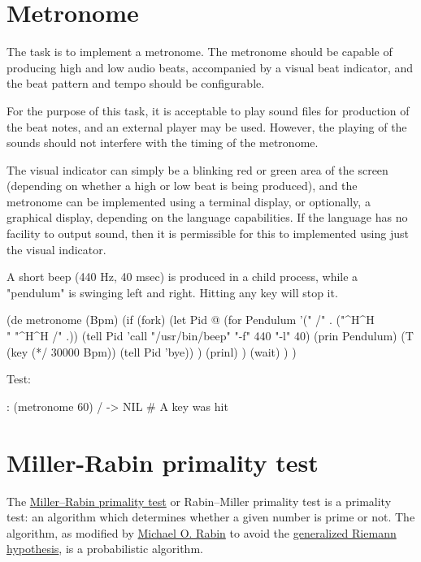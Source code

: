 \pagebreak{}
\section*{Metronome}

The task is to implement a metronome. The metronome should be capable of
producing high and low audio beats, accompanied by a visual beat
indicator, and the beat pattern and tempo should be configurable.

For the purpose of this task, it is acceptable to play sound files for
production of the beat notes, and an external player may be used.
However, the playing of the sounds should not interfere with the timing
of the metronome.

The visual indicator can simply be a blinking red or green area of the
screen (depending on whether a high or low beat is being produced), and
the metronome can be implemented using a terminal display, or
optionally, a graphical display, depending on the language capabilities.
If the language has no facility to output sound, then it is permissible
for this to implemented using just the visual indicator.


\begin{wideverbatim}

A short beep (440 Hz, 40 msec) is produced in a child process, while a
"pendulum" is swinging left and right. Hitting any key will stop it.

(de metronome (Bpm)
   (if (fork)
      (let Pid @
         (for Pendulum '(" /" . ("^H^H\\ " "^H^H /" .))
            (tell Pid 'call "/usr/bin/beep" "-f" 440 "-l" 40)
            (prin Pendulum)
            (T (key (*/ 30000 Bpm)) (tell Pid 'bye)) )
         (prinl) )
      (wait) ) )

Test:

: (metronome 60)
 /
-> NIL  # A key was hit

\end{wideverbatim}

\pagebreak{}
\section*{Miller-Rabin primality test}

The
\href{http://en.wikipedia.org/wiki/Miller\%E2\%80\%93Rabin\_primality\_test}{Miller--Rabin
  primality test} or Rabin--Miller primality test is a primality test:
an algorithm which determines whether a given number is prime or not.
The algorithm, as modified by
\href{http://en.wikipedia.org/wiki/Michael\_O.\_Rabin}{Michael O.
  Rabin} to avoid the
\href{http://en.wikipedia.org/wiki/generalized\_Riemann\_hypothesis}{generalized
  Riemann hypothesis}, is a probabilistic algorithm.

